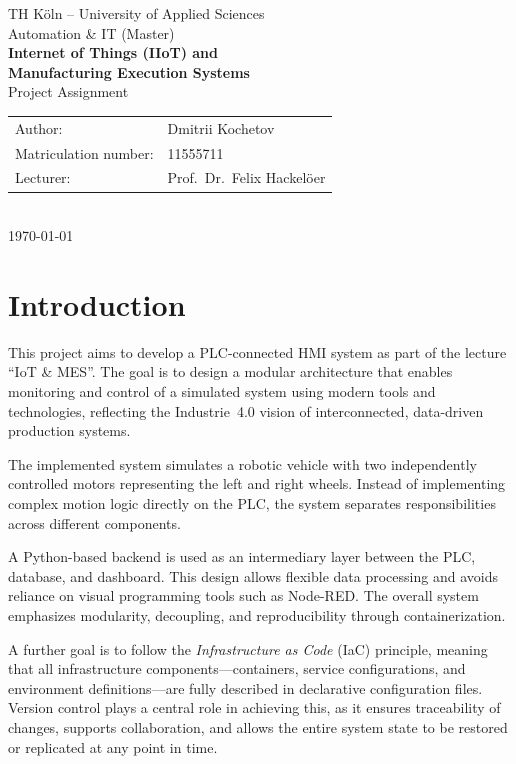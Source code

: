 \documentclass[a4paper,11pt]{article}
\begin{document}
\begin{titlepage}
\thispagestyle{firstpage}
\vspace*{3cm}
\begin{center}
    {\large TH Köln -- University of Applied Sciences}\\[0.3cm]
    {\large Automation \& IT (Master)}\\[2.5cm]
    {\LARGE\bfseries Internet of Things (IIoT) and\\[0.3cm]Manufacturing Execution Systems}\\[0.8cm]
    {\large Project Assignment}\\[2.5cm]
    \begin{tabular}{ll}
        Author:                & Dmitrii Kochetov \\[0.3cm]
        Matriculation number:  & 11555711 \\[0.3cm]
        Lecturer:              & Prof.\ Dr.\ Felix Hackelöer \\
    \end{tabular}\\[2.5cm]
    {\large \today}
\end{center}
\end{titlepage}

\tableofcontents
\newpage

\section{Introduction}

This project aims to develop a PLC-connected HMI system as part of the lecture ``IoT \& MES''.
The goal is to design a modular architecture that enables monitoring and control of a simulated
system using modern tools and technologies, reflecting the Industrie~4.0 vision of interconnected,
data-driven production systems.

The implemented system simulates a robotic vehicle with two independently controlled motors representing
the left and right wheels. Instead of implementing complex motion logic directly on the PLC, the system
separates responsibilities across different components.

A Python-based backend is used as an intermediary layer between the PLC, database, and dashboard.
This design allows flexible data processing and avoids reliance on visual programming tools such as
Node-RED. The overall system emphasizes modularity, decoupling, and reproducibility through containerization.

A further goal is to follow the \textit{Infrastructure as Code} (IaC) principle, meaning that all
infrastructure components---containers, service configurations, and environment definitions---are
fully described in declarative configuration files. Version control plays a central role in achieving
this, as it ensures traceability of changes, supports collaboration, and allows the entire system
state to be restored or replicated at any point in time.
\end{document}
